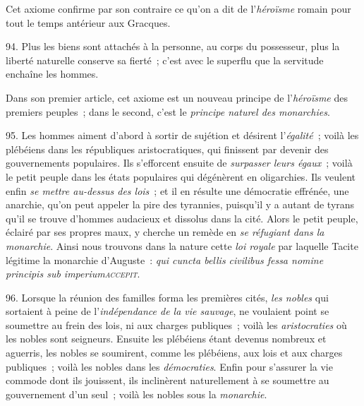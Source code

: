 \documentclass[french,twoside]{book} %
\begin{document}
Cet axiome confirme par son contraire ce qu’on a dit de l’{\itshape héroïsme} romain pour tout le temps antérieur aux Gracques.\par
94. Plus les biens sont attachés à la personne, au corps du possesseur, plus la liberté naturelle conserve sa fierté ; c’est avec le superflu que la servitude enchaîne les hommes.\par
Dans son premier article, cet axiome est un nouveau principe de l’{\itshape héroïsme} des premiers peuples ; dans le second, c’est le {\itshape principe naturel des monarchies}.\par
95. Les hommes aiment d’abord à sortir de sujétion et désirent l’{\itshape égalité} ; voilà les plébéiens dans les républiques aristocratiques, qui finissent par devenir des gouvernements populaires. Ils s’efforcent ensuite de {\itshape surpasser leurs égaux} ; voilà le petit peuple dans les états populaires qui dégénèrent en oligarchies. Ils veulent enfin {\itshape se mettre au-dessus des lois} ; et il en résulte une démocratie effrénée, une anarchie, qu’on peut appeler la pire des tyrannies, puisqu’il y a autant de tyrans qu’il se trouve d’hommes audacieux et dissolus dans la cité. Alors le petit peuple, éclairé par ses propres maux, y cherche un  remède en {\itshape se réfugiant dans la monarchie}. Ainsi nous trouvons dans la nature cette {\itshape loi royale} par laquelle Tacite légitime la monarchie d’Auguste : \emph{{\itshape qui cuncta bellis civilibus fessa nomine principis sub imperium}{\scshape accepit}}.\par
96. Lorsque la réunion des familles forma les premières cités, {\itshape les nobles} qui sortaient à peine de l’{\itshape indépendance de la vie sauvage}, ne voulaient point se soumettre au frein des lois, ni aux charges publiques ; voilà les {\itshape aristocraties} où les nobles sont seigneurs. Ensuite les plébéiens étant devenus nombreux et aguerris, les nobles se soumirent, comme les plébéiens, aux lois et aux charges publiques ; voilà les nobles dans les {\itshape démocraties}. Enfin pour s’assurer la vie commode dont ils jouissent, ils inclinèrent naturellement à se soumettre au gouvernement d’un seul ; voilà les nobles sous la {\itshape monarchie}.
\end{document}
